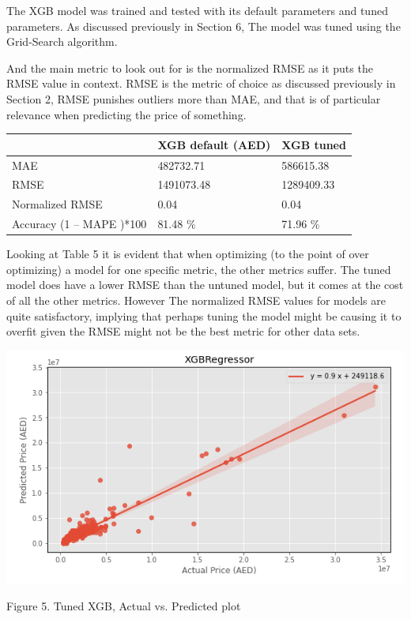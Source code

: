 \documentclass[conference]{IEEEtran}
\begin{document}
The XGB model was trained and tested with its default parameters and tuned parameters. As discussed previously in Section 6, The model was tuned using the Grid-Search algorithm. 

And the main metric to look out for is the normalized RMSE as it puts the RMSE value in context. RMSE is the metric of choice as discussed previously in Section 2, RMSE punishes outliers more than MAE, and that is of particular relevance when predicting the price of something. 

\smallbreak
\smallbreak
\smallbreak
\footnotesize
\begin{tabular}{|l|l|l}
\hline
                            & XGB   default (AED) & XGB tuned  \\ \hline
MAE                         & 482732.71           & 586615.38  \\ \hline
RMSE                        & 1491073.48          & 1289409.33 \\ \hline
Normalized   RMSE           & 0.04                & 0.04       \\ \hline
Accuracy (1 – MAPE )*100 & 81.48 \%            & 71.96 \%   \\ \hline
\end{tabular}
\smallbreak
{}
\smallbreak
\smallbreak
\smallbreak
\normalsize

Looking at Table 5 it is evident that when optimizing (to the point of over optimizing) a model for one specific metric, the other metrics suffer. The tuned model does have a lower RMSE than the untuned model, but it comes at the cost of all the other metrics. However The normalized RMSE values for models are quite satisfactory, implying that perhaps tuning the model might be causing it to overfit given the RMSE might not be the best metric for other data sets.

\smallbreak
\smallbreak
\smallbreak
\includegraphics[scale = 0.55]{images/xgb.png}
\caption {Figure 5. Tuned XGB, Actual vs. Predicted plot}
\smallbreak
\smallbreak
\smallbreak
\end{document}
